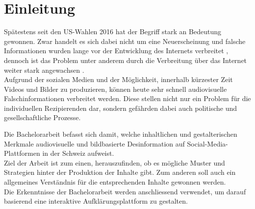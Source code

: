 \documentclass[12pt,a4paper]{article}        %
\begin{document}
\pagebreak
\thispagestyle{empty}
\tableofcontents        %
\pagebreak

\clearpage       %
\listoffigures
{}
\listoftables

\pagebreak
\setcounter{page}{1}    %
\section{Einleitung}
Spätestens seit den US-Wahlen 2016 hat der Begriff  stark an Bedeutung gewonnen. Zwar handelt es sich dabei nicht um eine Neuerscheinung und falsche Informationen wurden lange vor der Entwicklung des Internets verbreitet \parencites[214]{allcott_social_2017}[247]{hohlfeld_schlechte_2020}[1]{khan_fake_2021}, dennoch ist das Problem unter anderem durch die Verbreitung über das Internet weiter stark angewachsen \parencites[214–215]{allcott_social_2017}[1]{khan_fake_2021}[1]{lazer_science_2018}[4]{ceron_fake_2021}.\\
Aufgrund der sozialen Medien und der Möglichkeit, innerhalb kürzester Zeit Videos und Bilder zu produzieren, können heute sehr schnell audiovisuelle Falschinformationen verbreitet werden. Diese stellen nicht nur ein Problem für die individuellen Rezipierenden dar, sondern gefährden dabei auch politische und gesellschaftliche Prozesse.

Die Bachelorarbeit befasst sich damit, welche inhaltlichen und gestalterischen Merkmale audiovisuelle und bildbasierte Desinformation auf Social-Media-Plattformen in der Schweiz aufweist. \\
Ziel der Arbeit ist zum einen, herauszufinden, ob es mögliche Muster und Strategien hinter der Produktion der Inhalte gibt. Zum anderen soll auch ein allgemeines Verständnis für die entsprechenden Inhalte gewonnen werden. \\
Die Erkenntnisse der Bachelorarbeit werden anschliessend verwendet, um darauf basierend eine interaktive Aufklärungsplattform zu gestalten.
\end{document}
